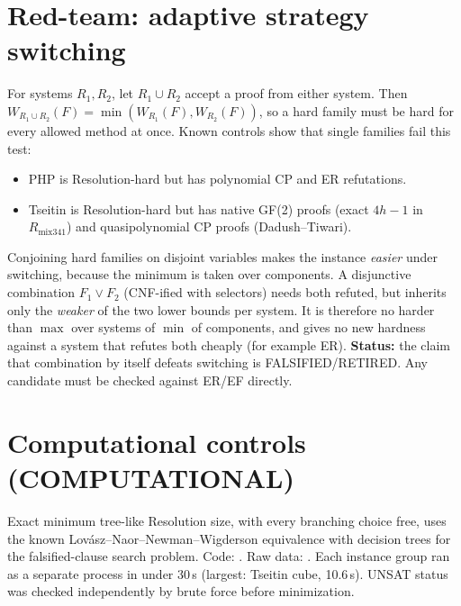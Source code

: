 \documentclass[11pt]{article}
\begin{document}
\section{Red-team: adaptive strategy switching}
For systems $R_1,R_2$, let $R_1\cup R_2$ accept a proof from either system. Then
$W_{R_1\cup R_2}(F)=\min(W_{R_1}(F),W_{R_2}(F))$, so a hard family must be hard for
every allowed method at once. Known controls show that single families fail this
test:
\begin{itemize}
\item PHP is Resolution-hard but has polynomial CP and ER refutations.
\item Tseitin is Resolution-hard but has native GF(2) proofs (exact $4h-1$ in $R_{\mathrm{mix341}}$) and quasipolynomial CP proofs (Dadush--Tiwari).
\end{itemize}
Conjoining hard families on disjoint variables makes the instance \emph{easier}
under switching, because the minimum is taken over components. A disjunctive
combination $F_1\vee F_2$ (CNF-ified with selectors) needs both refuted, but
inherits only the \emph{weaker} of the two lower bounds per system. It is
therefore no harder than $\max$ over systems of $\min$ of components, and gives no
new hardness against a system that refutes both cheaply (for example ER).
\textbf{Status:} the claim that combination by itself defeats switching is FALSIFIED/RETIRED. Any
candidate must be checked against ER/EF directly.

\section{Computational controls (COMPUTATIONAL)}
Exact minimum tree-like Resolution size, with every branching choice free, uses the
known Lov\'asz--Naor--Newman--Wigderson equivalence with decision trees for the
falsified-clause search problem. Code:
. Raw data:
.
Each instance group ran as a separate process in under 30\,s (largest: Tseitin cube, 10.6\,s).
UNSAT status was checked independently by brute force before minimization.
\end{document}
